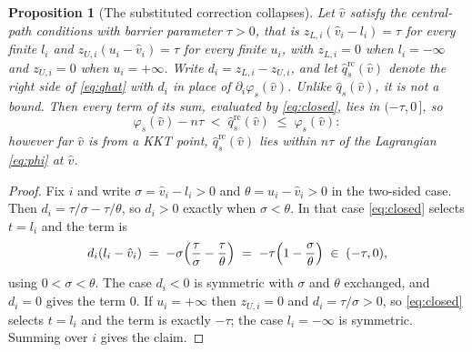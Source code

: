 \documentclass[11pt]{article}
\theoremstyle{plain}
\newtheorem{proposition}[lemma]{Proposition}
\theoremstyle{remark}
\newcommand{\vhat}{\hat{v}}
\newcommand{\qhat}{\hat{q}}
\begin{document}
\begin{proposition}[The substituted correction collapses]\label{prop:collapse}
Let $\vhat$ satisfy the central-path conditions with barrier parameter
$\tau > 0$, that is
$z_{L,i}(\vhat_i - l_i) = \tau$ for every finite $l_i$ and
$z_{U,i}(u_i - \vhat_i) = \tau$ for every finite $u_i$, with $z_{L,i} = 0$ when
$l_i = -\infty$ and $z_{U,i} = 0$ when $u_i = +\infty$.  Write
$d_i = z_{L,i} - z_{U,i}$, and let $\qhat_s^{\mathrm{rc}}(\vhat)$ denote the
right side of \eqref{eq:qhat} with $d_i$ in place of
$\partial_i \varphi_s(\vhat)$.  Unlike $\qhat_s(\vhat)$, it is not a bound.
Then every term of its sum, evaluated by \eqref{eq:closed}, lies in
$(-\tau, 0\,]$, so
\[
  \varphi_s(\vhat) - n\tau \;<\; \qhat_s^{\mathrm{rc}}(\vhat) \;\le\; \varphi_s(\vhat) :
\]
however far $\vhat$ is from a KKT point, $\qhat_s^{\mathrm{rc}}(\vhat)$ lies
within $n\tau$ of the Lagrangian \eqref{eq:phi} at $\vhat$.
\end{proposition}

\begin{proof}
Fix $i$ and write $\sigma = \vhat_i - l_i > 0$ and $\theta = u_i - \vhat_i > 0$
in the two-sided case.  Then $d_i = \tau/\sigma - \tau/\theta$, so $d_i > 0$
exactly when $\sigma < \theta$.  In that case \eqref{eq:closed} selects
$t = l_i$ and the term is
\[
  d_i (l_i - \vhat_i) \;=\; -\sigma\Bigl(\frac{\tau}{\sigma} - \frac{\tau}{\theta}\Bigr)
  \;=\; -\tau\Bigl(1 - \frac{\sigma}{\theta}\Bigr) \;\in\; (-\tau, 0),
\]
using $0 < \sigma < \theta$.  The case $d_i < 0$ is symmetric with $\sigma$ and
$\theta$ exchanged, and $d_i = 0$ gives the term $0$.  If $u_i = +\infty$ then
$z_{U,i} = 0$ and $d_i = \tau/\sigma > 0$, so \eqref{eq:closed} selects
$t = l_i$ and the term is exactly $-\tau$; the case $l_i = -\infty$ is
symmetric.  Summing over $i$ gives the claim.
\end{proof}
\end{document}
